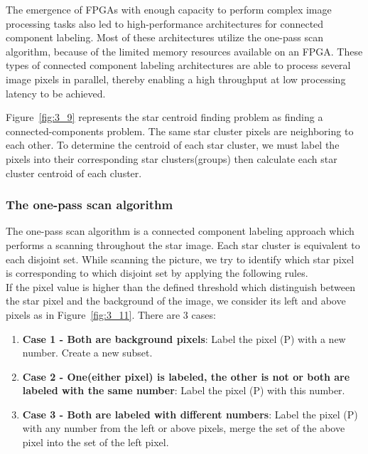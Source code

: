 \noindent The emergence of FPGAs with enough capacity to perform complex image processing tasks also led to high-performance architectures for connected component labeling\cite{CCA}. Most of these architectures utilize the one-pass scan algorithm, because of the limited memory resources available on an FPGA. These types of connected component labeling architectures are able to process several image pixels in parallel, thereby enabling a high throughput at low processing latency to be achieved\cite{000384075100011n.d.}. \\


\noindent Figure~\ref{fig:3_9} represents the star centroid finding problem as finding a connected-components problem. The same star cluster pixels are neighboring to each other. To determine the centroid of each star cluster, we must label the pixels into their corresponding star clusters(groups) then calculate each star cluster centroid of each cluster. \\

\subsubsection{The one-pass scan algorithm}

The one-pass scan algorithm is a connected component labeling approach which performs a scanning throughout the star image. Each star cluster is equivalent to each disjoint set. While scanning the picture, we try to identify which star pixel is corresponding to which disjoint set by applying the following rules. \\

\noindent If the pixel value is higher than the defined threshold which distinguish between the star pixel and the background of the image, we consider its left and above pixels as in Figure~\ref{fig:3_11}. There are 3 cases:

\begin{enumerate}
	\item \textbf{Case 1 - Both are background pixels}: Label the pixel (P) with a new number. Create a new subset.
	\item \textbf{Case 2 - One(either pixel) is labeled, the other is not or both are labeled with the same number}: Label the pixel (P) with this number.
	\item \textbf{Case 3 - Both are labeled with different numbers}: Label the pixel (P) with any number from the left or above pixels, merge the set of the above pixel into the set of the left pixel.
\end{enumerate}

